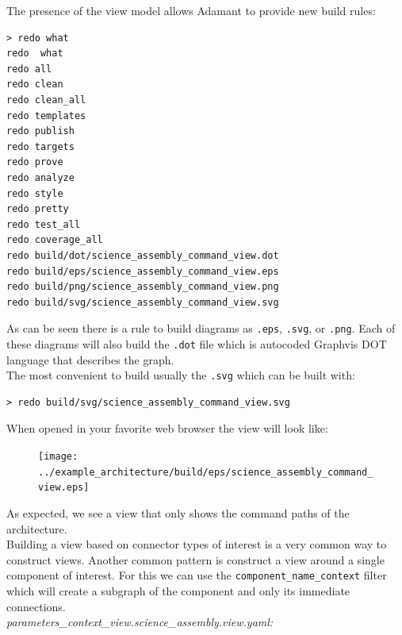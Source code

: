 The presence of the view model allows Adamant to provide new build rules:

\vspace{5mm} %
\begin{verbatim}
> redo what
redo  what
redo all
redo clean
redo clean_all
redo templates
redo publish
redo targets
redo prove
redo analyze
redo style
redo pretty
redo test_all
redo coverage_all
redo build/dot/science_assembly_command_view.dot
redo build/eps/science_assembly_command_view.eps
redo build/png/science_assembly_command_view.png
redo build/svg/science_assembly_command_view.svg
\end{verbatim}
\vspace{5mm} %

As can be seen there is a rule to build diagrams as \texttt{.eps}, \texttt{.svg}, or \texttt{.png}. Each of these diagrams will also build the \texttt{.dot} file which is autocoded Graphvis DOT language that describes the graph. \\

The most convenient to build usually the \texttt{.svg} which can be built with:

\vspace{5mm} %
\begin{verbatim}
> redo build/svg/science_assembly_command_view.svg
\end{verbatim}
\vspace{5mm} %

When opened in your favorite web browser the view will look like:

\begin{figure}[H]
  \texttt{[image: ../example\_architecture/build/eps/science\_assembly\_command\_view.eps]}
\end{figure}

As expected, we see a view that only shows the command paths of the architecture. \\

Building a view based on connector types of interest is a very common way to construct views. Another common pattern is construct a view around a single component of interest. For this we can use the \texttt{component\_name\_context} filter which will create a subgraph of the component and only its immediate connections. \\

\textit{parameters\_context\_view.science\_assembly.view.yaml:}

